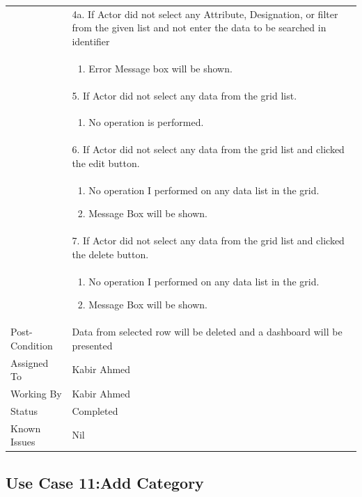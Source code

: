 \documentclass[12pt,a4paper]{article}
\begin{document}
\begin{longtable}{| p{3cm}|p{12cm}|}
& 4a. If Actor did not select any Attribute, Designation, or filter from the given list and not enter the data to be searched in identifier \\
& \begin{enumerate}
		\item Error Message box will be shown.
	\end{enumerate}
\\  
& 5. If Actor did not select any data from the grid list.  \\
& \begin{enumerate}
		\item No operation is performed.
	\end{enumerate}
	\\
& 6. If Actor did not select any data from the grid list and clicked the edit button.\\
& \begin{enumerate}
		\item No operation I performed on any data list in the grid.
            \item Message Box will be shown.
	\end{enumerate}
\\
&7. If Actor did not select any data from the grid list and clicked the delete button.\\
 	&\begin{enumerate}
			\item No operation I performed on any data list in the grid.
            \item Message Box will be shown.
	\end{enumerate}
\\ \hline 


Post-Condition &  Data from selected row will be deleted and a dashboard will be presented  \\ \hline

Assigned To &  Kabir Ahmed
\\ \hline
Working By &   Kabir Ahmed
\\ \hline
Status & 	Completed	
\\ \hline
Known Issues & Nil
\\\hline
\end{longtable}




\subsection{Use Case 11:Add Category}
\end{document}
